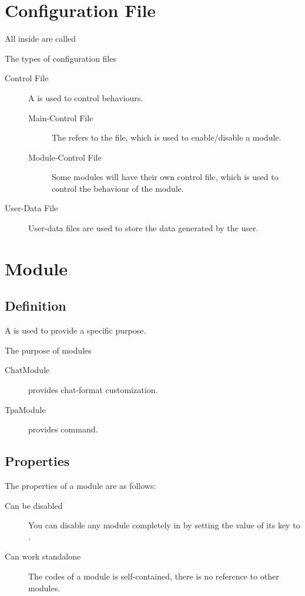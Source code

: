 \section{Configuration File}
All  inside  are called 

\begin{note}{The types of configuration files}
    \begin{description}
        \item[Control File] {A  is used to control behaviours.}
        \begin{description}
            \item[Main-Control File] The  refers to the  file, which is used to enable/disable a module.
            \item[Module-Control File] Some modules will have their own control file, which is used to control the behaviour of the module.
        \end{description}

        \item[User-Data File] User-data files are used to store the data generated by the user.
    \end{description}
\end{note}


\clearpage


\section{Module}

\subsection{Definition}
A  is used to provide a specific purpose.
\begin{example}{The purpose of modules}
    \begin{description}
        \item [ChatModule] provides chat-format customization.
        \item [TpaModule] provides  command.
    \end{description}
\end{example}

\subsection{Properties}
The properties of a module are as follows:
\begin{description}
    \item [Can be disabled] You can disable any module completely in  by setting the value of its  key to .
    \item [Can work standalone] The codes of a module is self-contained, there is no reference to other modules.
\end{description}

